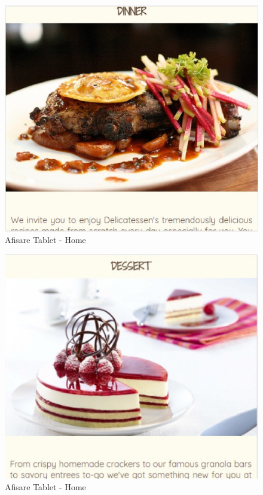 \documentclass[11pt]{article}
\begin{document}
\begin{figure}[h]
\includegraphics{images/125.eps}
\caption{Afisare Tablet - Home}
\end{figure}

\begin{figure}[h]
\includegraphics{images/126.eps}
\caption{Afisare Tablet - Home}
\end{figure}
\end{document}
